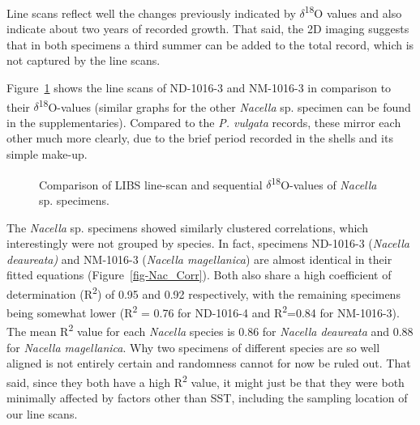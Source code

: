 \documentclass[
  authoryear,
  preprint,
  3p]{elsarticle}
\begin{document}
Line scans reflect well the changes previously indicated by
\(\delta\)\textsuperscript{18}O values and also indicate about two years
of recorded growth. That said, the 2D imaging suggests that in both
specimens a third summer can be added to the total record, which is not
captured by the line scans.

Figure~\ref{fig-Nac_Comp} shows the line scans of ND-1016-3 and
NM-1016-3 in comparison to their \(\delta\)\textsuperscript{18}O-values
(similar graphs for the other \emph{Nacella} sp. specimen can be found
in the supplementaries). Compared to the \emph{P. vulgata} records,
these mirror each other much more clearly, due to the brief period
recorded in the shells and its simple make-up.

\begin{figure}


\caption{\label{fig-Nac_Comp}Comparison of LIBS line-scan and sequential
\(\delta\)\textsuperscript{18}O-values of \emph{Nacella} sp. specimens.}

\end{figure}%

The \emph{Nacella} sp. specimens showed similarly clustered
correlations, which interestingly were not grouped by species. In fact,
specimens ND-1016-3 (\emph{Nacella deaureata)} and NM-1016-3
(\emph{Nacella magellanica}) are almost identical in their fitted
equations (Figure~\ref{fig-Nac_Corr}). Both also share a high
coefficient of determination (R\textsuperscript{2}) of 0.95 and 0.92
respectively, with the remaining specimens being somewhat lower
(R\textsuperscript{2} = 0.76 for ND-1016-4 and R\textsuperscript{2}=0.84
for NM-1016-3). The mean R\textsuperscript{2} value for each
\emph{Nacella} species is 0.86 for \emph{Nacella deaureata} and 0.88 for
\emph{Nacella magellanica}. Why two specimens of different species are
so well aligned is not entirely certain and randomness cannot for now be
ruled out. That said, since they both have a high R\textsuperscript{2}
value, it might just be that they were both minimally affected by
factors other than SST, including the sampling location of our line
scans.
\end{document}
